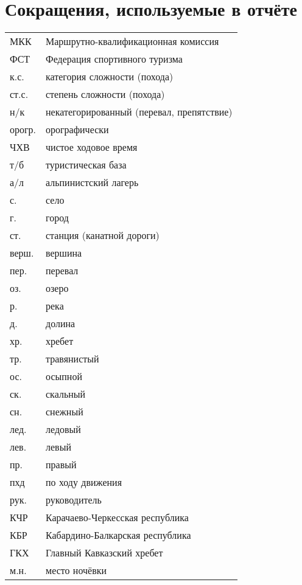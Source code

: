 \section*{Сокращения, используемые в отчёте}
\begin{tabular}{p{} p{}}
	МКК                                  &   Маршрутно-квалификационная комиссия  \\
	ФСТ                                &   Федерация спортивного туризма  \\
	к.с.                               &   категория сложности (похода)  \\
	ст.с.							& степень сложности (похода) \\
	н/к                            &   некатегорированный (перевал, препятствие) \\
	орогр.                &   орографически  \\
	ЧХВ                          &   чистое ходовое время  \\
	т/б                         &   туристическая база \\
	а/л                  &   альпинистский лагерь \\
		с. & село \\
	г. & город \\
	ст. & станция (канатной дороги) \\
	верш.               &   вершина \\
	пер.               &   перевал \\
	оз.             &   озеро \\
	р.             &   река \\
	д.	&	долина\\
	хр. &   хребет \\
	тр. &   травянистый \\
	ос. &   осыпной \\
	ск. &   скальный \\
	сн. &   снежный \\
	лед. &   ледовый \\
	лев. &   левый \\
	пр. &   правый \\
	пхд	&	по ходу движения	\\
	рук. &   руководитель \\	
	КЧР & Карачаево-Черкесская республика\\
	КБР & Кабардино-Балкарская республика\\
	ГКХ	&	Главный Кавказский хребет \\
	м.н. & место ночёвки
\end{tabular}
\clearpage